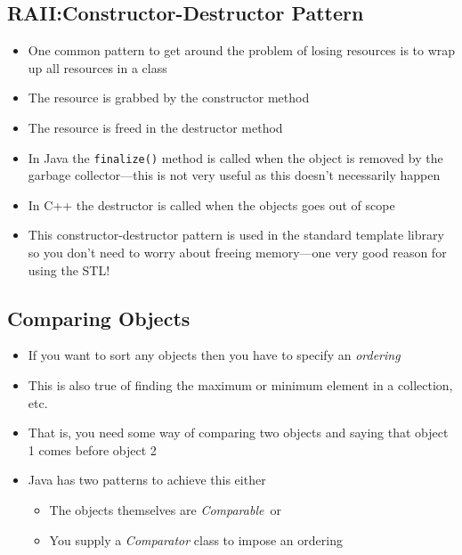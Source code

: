 
\begin{slide}
\section[-2]{RAII:Constructor-Destructor Pattern}

\begin{PauseHighLight}
  \begin{itemize}\squeeze
  \item One common pattern to get around the problem of losing resources
    is to wrap up all resources in a class\pause
  \item The resource is grabbed by the constructor method\pause
  \item The resource is freed in the destructor method\pause
  \item In Java the \texttt{finalize()} method is called when the object
    is removed by the garbage collector\pause---this is not very useful
    as this doesn't necessarily happen\pause
  \item In C++ the destructor is called when the objects goes out of
    scope\pause
  \item This constructor-destructor pattern is used in the standard
    template library so you don't need to worry about freeing
    memory\pause---one very good reason for using the STL!\pause
  \end{itemize}
\end{PauseHighLight}
\end{slide}


\Outline

\begin{slide}
\section{Comparing Objects}

\begin{PauseHighLight}
  \begin{itemize}
  \item If you want to sort any objects then you have to specify an
    \emph{ordering}\pause
  \item This is also true of finding the maximum or minimum element in a
    collection, etc.\pause
  \item That is, you need some way of comparing two objects and saying
    that object 1 comes before object 2\pause
  \item Java has two patterns to achieve this either
    \begin{itemize}
    \item The objects themselves are \emph{Comparable}\pause\ or
    \item You supply a \emph{Comparator} class to impose an ordering\pause
    \end{itemize}
  \end{itemize}
\end{PauseHighLight}

\end{slide}

